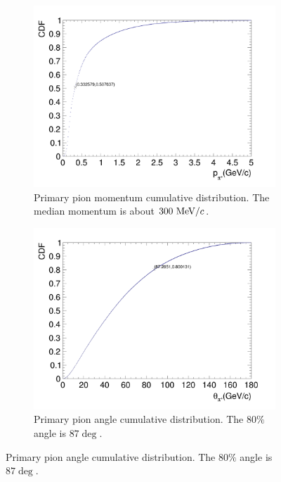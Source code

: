           \begin{figure}[t]
               \centering
               \begin{subfigure}{\dbfigwid\textwidth}
                    \includegraphics[width=\textwidth]{figures/sel/inclusive_pion_mom_CDF_0.5.png}
                    \caption{Primary pion momentum cumulative distribution. The median momentum is about $300~\textrm{MeV}/c$.}
                    \label{subfig:pi-mom-cum}
               \end{subfigure}
               \begin{subfigure}{\dbfigwid\textwidth}
                    \includegraphics[width=\textwidth]{figures/sel/inclusive_pion_theta_CDF_0.8.png}
                    \caption{Primary pion angle cumulative distribution. The $80\%$ angle is $87\deg$.}
                    \label{subfig:pi-theta-cum}
               \end{subfigure}
          \end{figure}
               
